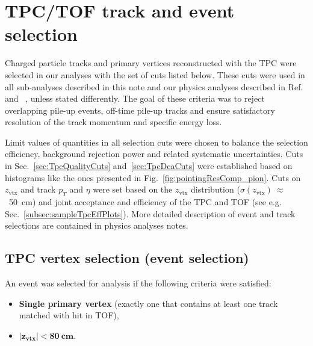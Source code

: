 

\chapter{TPC/TOF track and event selection}\label{chap:TpcTrackQualityCuts}

Charged particle tracks and primary vertices reconstructed with the TPC were selected in our analyses with the set of cuts listed below. These cuts were used in all sub-analyses described in this note and our physics analyses described in Ref.~\cite{AnalysisNoteRafal} and ~\cite{AnalysisNoteLukasz}, unless stated differently. The goal of these criteria was to reject overlapping pile-up events, off-time pile-up tracks and ensure satisfactory resolution of the track momentum and specific energy loss.

Limit values of quantities in all selection cuts were chosen to balance the selection efficiency, background rejection power and related systematic uncertainties. Cuts in Sec.~\ref{sec:TpcQualityCuts} and~\ref{sec:TpcDcaCuts} were established based on histograms like the ones presented in Fig.~\ref{fig:pointingResComp_pion}. Cuts on $z_{\text{vtx}}$ and track $p_{T}$ and $\eta$ were set based on the $z_{\text{vtx}}$ distribution ($\sigma(z_{\text{vtx}})~\approx$~50~cm) and joint acceptance and efficiency of the TPC and TOF (see e.g. Sec.~\ref{subsec:sampleTpcEffPlots}). More detailed description of event and track selections are contained in physics analyses notes\cite{AnalysisNoteRafal,AnalysisNoteLukasz}.

\section{TPC vertex selection (event selection)}
An event was selected for analysis if the following criteria were satisfied:
\begin{itemize}
	\item \textbf{Single primary vertex} (exactly one that contains at least one track matched with hit in TOF),
	\item \textbf{$\bm{|z_{\text{vtx}}|<80~\text{cm}}$}.
\end{itemize}

